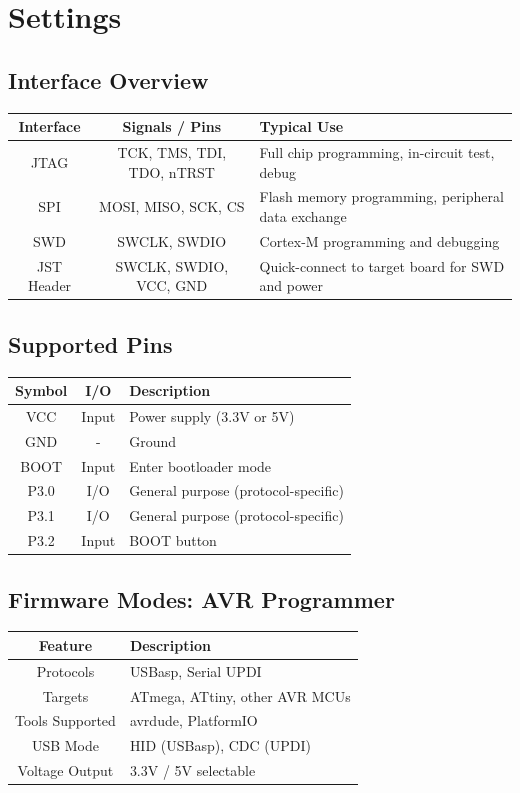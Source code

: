 \documentclass[10pt]{article}
\begin{document}
\vspace{1em}



\section*{Settings}

\subsection*{Interface Overview}
\begin{tabularx}{\textwidth}{|c|c|>{\RaggedRight\arraybackslash}X|}
\hline
\rowcolor{headergray}
Interface & Signals / Pins & Typical Use \\
\hline
JTAG & TCK, TMS, TDI, TDO, nTRST & Full chip programming, in-circuit test, debug \\
SPI & MOSI, MISO, SCK, CS & Flash memory programming, peripheral data exchange \\
SWD & SWCLK, SWDIO & Cortex-M programming and debugging \\
JST Header & SWCLK, SWDIO, VCC, GND & Quick-connect to target board for SWD and power \\
\hline
\end{tabularx}


\subsection*{Supported Pins}
\begin{tabularx}{\textwidth}{|c|c|>{\RaggedRight\arraybackslash}X|}
\hline
\rowcolor{headergray}
Symbol & I/O & Description \\
\hline
VCC & Input & Power supply (3.3V or 5V) \\
GND & - & Ground \\
BOOT & Input & Enter bootloader mode \\
P3.0 & I/O & General purpose (protocol-specific) \\
P3.1 & I/O & General purpose (protocol-specific) \\
P3.2 & Input & BOOT button \\
\hline
\end{tabularx}


\subsection*{Firmware Modes: AVR Programmer}
\begin{tabularx}{\textwidth}{|c|>{\RaggedRight\arraybackslash}X|}
\hline
\rowcolor{headergray}
Feature & Description \\
\hline
Protocols & USBasp, Serial UPDI \\
Targets & ATmega, ATtiny, other AVR MCUs \\
Tools Supported & avrdude, PlatformIO \\
USB Mode & HID (USBasp), CDC (UPDI) \\
Voltage Output & 3.3V / 5V selectable \\
\hline
\end{tabularx}
\end{document}
